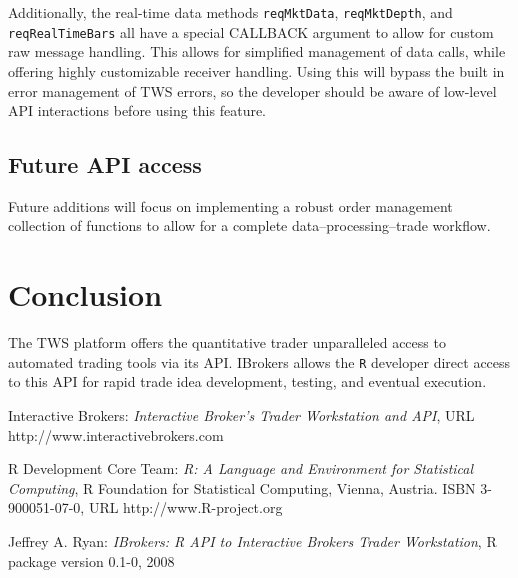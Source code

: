 \documentclass{article}
\begin{document}
Additionally, the
real-time data methods {\tt reqMktData}, {\tt reqMktDepth}, and
{\tt reqRealTimeBars} all have a special CALLBACK
argument to allow for custom raw message handling. This allows for
simplified management of data calls, while offering highly
customizable receiver handling. Using this will
bypass the built in error management of TWS errors, so the
developer should be aware of low-level API interactions
before using this feature.

\subsection{Future API access}
Future additions will focus on implementing a robust order
management collection of functions to allow for a complete
data--processing--trade workflow.

\section{Conclusion}
The TWS platform offers the quantitative trader unparalleled
access to automated trading tools via its API.  IBrokers
allows the {\tt R} developer direct access to this API
for rapid trade idea development, testing, and eventual execution.

\begin{thebibliography}{99}
 Interactive Brokers:
\emph{Interactive Broker's \emph{Trader Workstation} and API},
URL http://www.interactivebrokers.com

 R Development Core Team:
\emph{R: A Language and Environment for Statistical Computing},
R Foundation for Statistical Computing, Vienna, Austria.
ISBN 3-900051-07-0, URL http://www.R-project.org

 Jeffrey A. Ryan:
\emph{IBrokers: R API to Interactive Brokers Trader Workstation},
R package version 0.1-0, 2008
\end{thebibliography}
\end{document}
